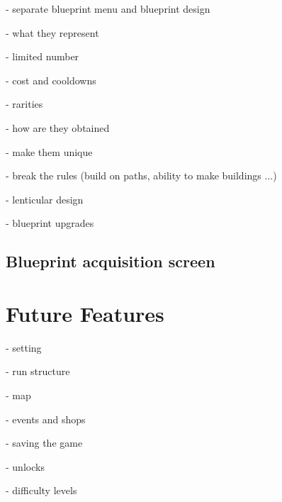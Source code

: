 - separate blueprint menu and blueprint design

- what they represent

- limited number

- cost and cooldowns

- rarities

- how are they obtained

- make them unique

- break the rules (build on paths, ability to make buildings ...)

- lenticular design

- blueprint upgrades

\subsection{Blueprint acquisition screen}

\section{Future Features}

- setting

- run structure

- map

- events and shops

- saving the game

- unlocks

- difficulty levels
